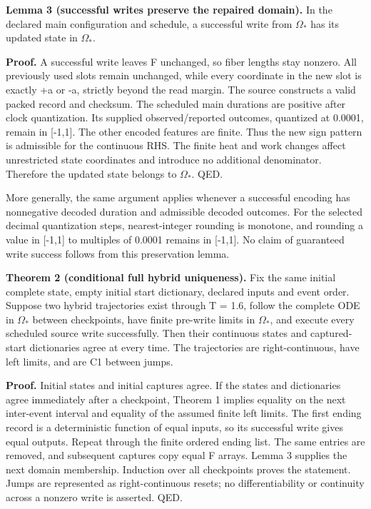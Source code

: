 \documentclass[11pt,a4paper]{article}
\begin{document}
\textbf{Lemma 3 (successful writes preserve the repaired domain).} In the declared main configuration and schedule, a successful write from \(\Omega_*\) has its updated state in \(\Omega_*\).

\textbf{Proof.} A successful write leaves F unchanged, so fiber lengths stay nonzero. All previously used slots remain unchanged, while every coordinate in the new slot is exactly +a or -a, strictly beyond the read margin. The source constructs a valid packed record and checksum. The scheduled main durations are positive after clock quantization. Its supplied observed/reported outcomes, quantized at 0.0001, remain in [-1,1]. The other encoded features are finite. Thus the new sign pattern is admissible for the continuous RHS. The finite heat and work changes affect unrestricted state coordinates and introduce no additional denominator. Therefore the updated state belongs to \(\Omega_*\). QED.

More generally, the same argument applies whenever a successful encoding has nonnegative decoded duration and admissible decoded outcomes. For the selected decimal quantization steps, nearest-integer rounding is monotone, and rounding a value in [-1,1] to multiples of 0.0001 remains in [-1,1]. No claim of guaranteed write success follows from this preservation lemma.

\textbf{Theorem 2 (conditional full hybrid uniqueness).} Fix the same initial complete state, empty initial start dictionary, declared inputs and event order. Suppose two hybrid trajectories exist through T = 1.6, follow the complete ODE in \(\Omega_*\) between checkpoints, have finite pre-write limits in \(\Omega_*\), and execute every scheduled source write successfully. Then their continuous states and captured-start dictionaries agree at every time. The trajectories are right-continuous, have left limits, and are C1 between jumps.

\textbf{Proof.} Initial states and initial captures agree. If the states and dictionaries agree immediately after a checkpoint, Theorem 1 implies equality on the next inter-event interval and equality of the assumed finite left limits. The first ending record is a deterministic function of equal inputs, so its successful write gives equal outputs. Repeat through the finite ordered ending list. The same entries are removed, and subsequent captures copy equal F arrays. Lemma 3 supplies the next domain membership. Induction over all checkpoints proves the statement. Jumps are represented as right-continuous resets; no differentiability or continuity across a nonzero write is asserted. QED.
\end{document}
